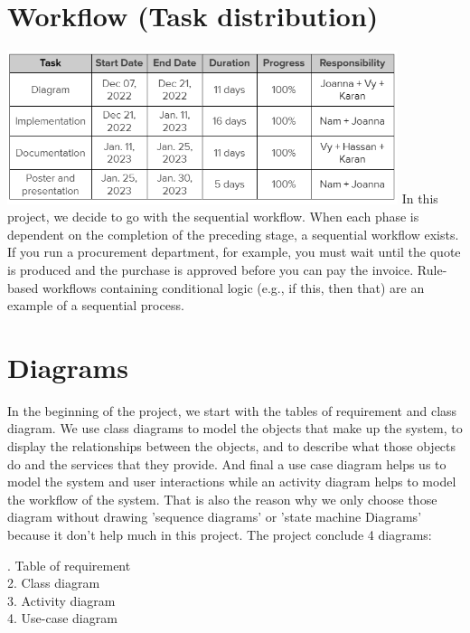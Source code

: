 \chapter{Workflow (Task distribution)}
\label{workflow-task-distribution}
\includegraphics[width=4.5in]{images/Work flow.png}
\break
{
In this project, we decide to go with the sequential workflow. When each
phase is dependent on the completion of the preceding stage, a
sequential workflow exists. If you run a procurement department, for
example, you must wait until the quote is produced and the purchase is
approved before you can pay the invoice. Rule-based workflows containing
conditional logic (e.g., if this, then that) are an example of a
sequential process.
}
\clearpage

\chapter{Diagrams}
{
In the beginning of the project, we start with the tables of requirement and class diagram. We use class diagrams to model the objects that make up the system, to display the relationships between the objects, and to describe what those objects do and the services that they provide. And final a use case diagram helps us to model the system and user interactions while an activity diagram helps to model the workflow of the system. That is also the reason why we only choose those diagram without drawing 'sequence diagrams' or 'state machine Diagrams' because it don't help much in this project. The project conclude 4 diagrams:
}

{
. Table of requirement \\
2. Class diagram \\
3. Activity diagram \\
4. Use-case diagram \\
}
\clearpage

